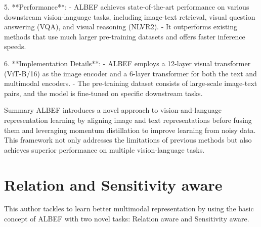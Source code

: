 5. **Performance**:
   - ALBEF achieves state-of-the-art performance on various downstream vision-language tasks, including image-text retrieval, visual question answering (VQA), and visual reasoning (NLVR2).
   - It outperforms existing methods that use much larger pre-training datasets and offers faster inference speeds.

6. **Implementation Details**:
   - ALBEF employs a 12-layer visual transformer (ViT-B/16) as the image encoder and a 6-layer transformer for both the text and multimodal encoders.
   - The pre-training dataset consists of large-scale image-text pairs, and the model is fine-tuned on specific downstream tasks.

 Summary
ALBEF introduces a novel approach to vision-and-language representation learning by aligning image and text representations before fusing them and leveraging momentum distillation to improve learning from noisy data. This framework not only addresses the limitations of previous methods but also achieves superior performance on multiple vision-language tasks.

\section{Relation and Sensitivity aware}
This author tackles to learn better multimodal representation by using the basic concept of ALBEF with two novel tasks: Relation aware and Sensitivity aware.